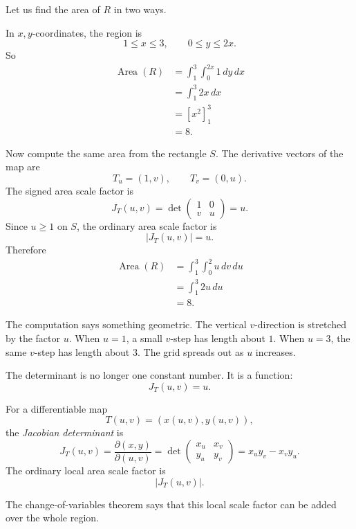 Let us find the area of \(R\) in two ways.

In \(x,y\)-coordinates, the region is
\[
    1\le x\le3,\qquad 0\le y\le2x.
\]
So
\[
\begin{aligned}
    \operatorname{Area}(R)
    &=
    \int_1^3\int_0^{2x}1\,dy\,dx\\
    &=
    \int_1^3 2x\,dx\\
    &=
    \left[x^2\right]_1^3\\
    &=
    8.
\end{aligned}
\]

Now compute the same area from the rectangle \(S\).  The derivative vectors of the map
are
\[
    T_u=(1,v),
    \qquad
    T_v=(0,u).
\]
The signed area scale factor is
\[
    J_T(u,v)
    =
    \det
    \begin{pmatrix}
        1&0\\
        v&u
    \end{pmatrix}
    =
    u.
\]
Since \(u\ge1\) on \(S\), the ordinary area scale factor is
\[
    |J_T(u,v)|=u.
\]
Therefore
\[
\begin{aligned}
    \operatorname{Area}(R)
    &=
    \int_1^3\int_0^2 u\,dv\,du\\
    &=
    \int_1^3 2u\,du\\
    &=
    8.
\end{aligned}
\]

The computation says something geometric.  The vertical \(v\)-direction is stretched
by the factor \(u\).  When \(u=1\), a small \(v\)-step has length about \(1\).  When
\(u=3\), the same \(v\)-step has length about \(3\).  The grid spreads out as \(u\)
increases.

The determinant is no longer one constant number.  It is a function:
\[
    J_T(u,v)=u.
\]

\begin{definition}
For a differentiable map
\[
    T(u,v)=(x(u,v),y(u,v)),
\]
the \emph{Jacobian determinant} is
\[
\boxed{
    J_T(u,v)
    =
    \frac{\partial(x,y)}{\partial(u,v)}
    =
    \det
    \begin{pmatrix}
        x_u & x_v\\
        y_u & y_v
    \end{pmatrix}
    =
    x_u y_v-x_v y_u.
}
\]
The ordinary local area scale factor is
\[
\boxed{
    |J_T(u,v)|.
}
\]
\end{definition}

The change-of-variables theorem says that this local scale factor can be added over
the whole region.


